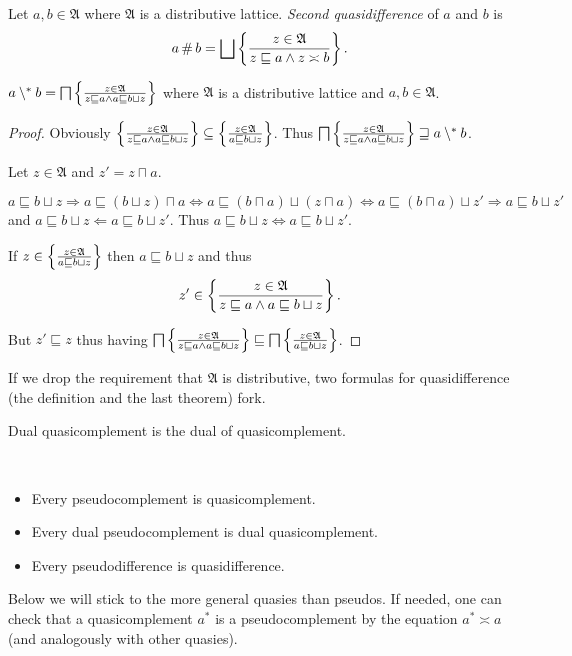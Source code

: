 \begin{defn}
Let $a,b\in\mathfrak{A}$ where $\mathfrak{A}$
is a distributive lattice. \emph{Second quasidifference} of $a$ and
$b$ is
\[
a\mathop\#b=\bigsqcup\setcond{z\in\mathfrak{A}}{z\sqsubseteq a\land z\asymp b}.
\]
\end{defn}
\begin{thm}
$a\setminus^{\ast} b=\bigsqcap\left\{ \frac{z\in\mathfrak{A}}{z\sqsubseteq a\land a\sqsubseteq b\sqcup z}\right\}$
where $\mathfrak{A}$ is a distributive lattice and $a,b\in\mathfrak{A}$.\end{thm}
\begin{proof}
Obviously $\left\{ \frac{z\in\mathfrak{A}}{z\sqsubseteq a\land a\sqsubseteq b\sqcup z}\right\}\subseteq\left\{ \frac{z\in\mathfrak{A}}{a\sqsubseteq b\sqcup z}\right\}$.
Thus $\bigsqcap\left\{ \frac{z\in\mathfrak{A}}{z\sqsubseteq a\land a\sqsubseteq b\sqcup z}\right\}\sqsupseteq a\setminus^{\ast} b$.

Let $z\in\mathfrak{A}$ and $z'=z\sqcap a$.

$a\sqsubseteq b\sqcup z\Rightarrow a\sqsubseteq(b\sqcup z)\sqcap a\Leftrightarrow a\sqsubseteq(b\sqcap a)\sqcup(z\sqcap a)\Leftrightarrow a\sqsubseteq(b\sqcap a)\sqcup z'\Rightarrow a\sqsubseteq b\sqcup z'$
and $a\sqsubseteq b\sqcup z\Leftarrow a\sqsubseteq b\sqcup z'$. Thus
$a\sqsubseteq b\sqcup z\Leftrightarrow a\sqsubseteq b\sqcup z'$.

If $z\in\left\{ \frac{z\in\mathfrak{A}}{a\sqsubseteq b\sqcup z}\right\}$ then
$a\sqsubseteq b\sqcup z$ and thus
\[
z'\in\left\{ \frac{z\in\mathfrak{A}}{z\sqsubseteq a\land a\sqsubseteq b\sqcup z}\right\}.
\]


But $z'\sqsubseteq z$ thus having $\bigsqcap\left\{ \frac{z\in\mathfrak{A}}{z\sqsubseteq a\land a\sqsubseteq b\sqcup z}\right\}\sqsubseteq\bigsqcap\left\{ \frac{z\in\mathfrak{A}}{a\sqsubseteq b\sqcup z}\right\}$.\end{proof}
\begin{rem}
If we drop the requirement that $\mathfrak{A}$ is distributive, two
formulas for quasidifference (the definition and the last theorem)
fork.\end{rem}
\begin{obvious}
Dual quasicomplement is the dual of quasicomplement.
\end{obvious}

\begin{obvious}
~
\begin{itemize}
\item Every pseudocomplement is quasicomplement.
\item Every dual pseudocomplement is dual quasicomplement.
\item Every pseudodifference is quasidifference.
\end{itemize}
\end{obvious}
Below we will stick to the more general quasies than pseudos. If needed,
one can check that a quasicomplement $a^{\ast}$ is a pseudocomplement
by the equation $a^{\ast}\asymp a$ (and analogously with other quasies).

